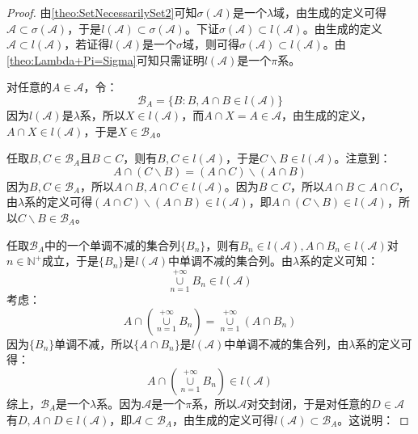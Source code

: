 \begin{proof}
	由\cref{theo:SetNecessarilySet2}可知$\sigma(\mathscr{A})$是一个$\lambda$域，由生成的定义可得$\mathscr{A}\subset\sigma(\mathscr{A})$，于是$l(\mathscr{A})\subset\sigma(\mathscr{A})$。下证$\sigma(\mathscr{A})\subset l(\mathscr{A})$。由生成的定义$\mathscr{A}\subset l(\mathscr{A})$，若证得$l(\mathscr{A})$是一个$\sigma$域，则可得$\sigma(\mathscr{A})\subset l(\mathscr{A})$。由\cref{theo:Lambda+Pi=Sigma}可知只需证明$l(\mathscr{A})$是一个$\pi$系。\par
	对任意的$A\in \mathscr{A}$，令：
	\begin{equation*}
		\mathscr{B}_A=\{B:B,A\cap B\in l(\mathscr{A})\}
	\end{equation*}
	因为$l(\mathscr{A})$是$\lambda$系，所以$X\in l(\mathscr{A})$，而$A\cap X=A\in\mathscr{A}$，由生成的定义，$A\cap X\in l(\mathscr{A})$，于是$X\in \mathscr{B}_A$。\par
	任取$B,C\in \mathscr{B}_A$且$B\subset C$，则有$B,C\in l(\mathscr{A})$，于是$C\backslash B\in l(\mathscr{A})$。注意到：
	\begin{equation*}
		A\cap(C\backslash B)=(A\cap C)\backslash(A\cap B)
	\end{equation*}
	因为$B,C\in \mathscr{B}_A$，所以$A\cap B,A\cap C\in l(\mathscr{A})$。因为$B\subset C$，所以$A\cap B\subset A\cap C$，由$\lambda$系的定义可得$(A\cap C)\backslash(A\cap B)\in l(\mathscr{A})$，即$A\cap(C\backslash B)\in l(\mathscr{A})$，所以$C\backslash B\in \mathscr{B}_A$。\par
	任取$\mathscr{B}_A$中的一个单调不减的集合列$\{B_n\}$，则有$B_n\in l(\mathscr{A}),A\cap B_n\in l(\mathscr{A})$对$n\in\mathbb{N}^+$成立，于是$\{B_n\}$是$l(\mathscr{A})$中单调不减的集合列。由$\lambda$系的定义可知：
	\begin{equation*}
		\underset{n=1}{\overset{+\infty}{\cup}}B_n\in l(\mathscr{A})
	\end{equation*}
	考虑：
	\begin{equation*}
		A\cap\left(\underset{n=1}{\overset{+\infty}{\cup}}B_n\right)
		=\underset{n=1}{\overset{+\infty}{\cup}}(A\cap B_n)
	\end{equation*}
	因为$\{B_n\}$单调不减，所以$\{A\cap B_n\}$是$l(\mathscr{A})$中单调不减的集合列，由$\lambda$系的定义可得：
	\begin{equation*}
		A\cap\left(\underset{n=1}{\overset{+\infty}{\cup}}B_n\right)\in l(\mathscr{A})
	\end{equation*}
	综上，$\mathscr{B}_A$是一个$\lambda$系。因为$\mathscr{A}$是一个$\pi$系，所以$\mathscr{A}$对交封闭，于是对任意的$D\in \mathscr{A}$有$D,A\cap D\in l(\mathscr{A})$，即$\mathscr{A}\subset \mathscr{B}_A$，由生成的定义可得$l(\mathscr{A})\subset \mathscr{B}_A$。这说明：

\end{proof}
